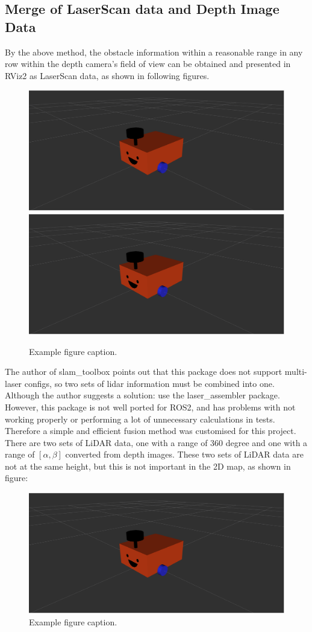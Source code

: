\subsection{Merge of LaserScan data and Depth Image Data}
By the above method, the obstacle information within a reasonable range in any row within the depth camera's field of view can be obtained and presented in RViz2 as LaserScan data, as shown in following figures.
\begin{figure}[H]
    \centering
    \includegraphics[width=0.8\linewidth]{figs/robot.png}
    \includegraphics[width=0.8\linewidth]{figs/robot.png}
    \caption{Example figure caption.}
\end{figure}
The author of slam\_toolbox points out that this package does not support multi-laser configs, so two sets of lidar information must be combined into one. Although the author suggests a solution: use the laser\_assembler package.
However, this package is not well ported for ROS2, and has problems with not working properly or performing a lot of unnecessary calculations in tests. Therefore a simple and efficient fusion method was customised for this project. There are two sets of LiDAR data, one with a range of 360 degree and one with a range of $[\alpha,\beta]$ converted from depth images. These two sets of LiDAR data are not at the same height, but this is not important in the 2D map, as shown in figure:
\begin{figure}[H]
    \centering
    \includegraphics[width=0.8\linewidth]{figs/robot.png}
    \caption{Example figure caption.}
\end{figure}
